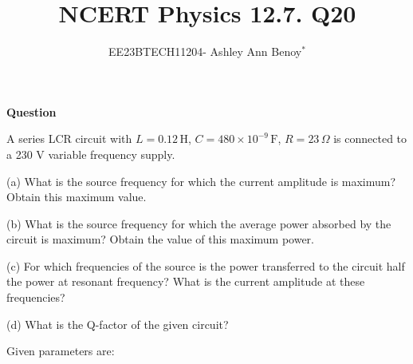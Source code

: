 \documentclass[journal,12pt,twocolumn]{IEEEtran}
\theoremstyle{remark}
\begin{document}

\vspace{3cm}

\title{NCERT Physics 12.7. Q20}
\author{EE23BTECH11204- Ashley Ann Benoy$^{*}$%
}
\maketitle
\newpage
\bigskip



\textbf{Question}

A series LCR circuit with 
\(L = 0.12 \, \text{H}\),
\(C = 480 \times 10^{-9} \, \text{F}\), 
\(R=23 \, \Omega\)
is connected to a 230 V variable frequency supply.

(a) What is the source frequency for which the current amplitude is maximum? Obtain this maximum value.

(b) What is the source frequency for which the average power absorbed by the circuit is maximum? Obtain the value of this maximum power.

(c) For which frequencies of the source is the power transferred to the circuit half the power at resonant frequency? What is the current amplitude at these frequencies?

(d) What is the Q-factor of the given circuit?
\fi

Given parameters are:



\end{document}
